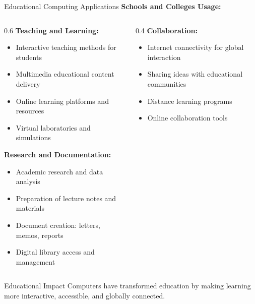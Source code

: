 \documentclass[aspectratio=169]{beamer}
\begin{document}
\begin{frame}{Educational Computing Applications}
    \textbf{Schools and Colleges Usage:}
    
    \begin{columns}
        \begin{column}{0.6\textwidth}
            \textbf{Teaching and Learning:}
            \begin{itemize}
                \item Interactive teaching methods for students
                \item Multimedia educational content delivery
                \item Online learning platforms and resources
                \item Virtual laboratories and simulations
            \end{itemize} 
            \textbf{Research and Documentation:}
            \begin{itemize}
                \item Academic research and data analysis
                \item Preparation of lecture notes and materials
                \item Document creation: letters, memos, reports
                \item Digital library access and management
            \end{itemize}
        \end{column}
        \begin{column}{0.4\textwidth}
            \textbf{Collaboration:}
            \begin{itemize}
                \item Internet connectivity for global interaction
                \item Sharing ideas with educational communities
                \item Distance learning programs
                \item Online collaboration tools
            \end{itemize}
        \end{column}
    \end{columns}
    
    \begin{alertblock}{Educational Impact}
    \tiny
        Computers have transformed education by making learning more interactive, accessible, and globally connected.
    \end{alertblock}
\end{frame}
\end{document}

